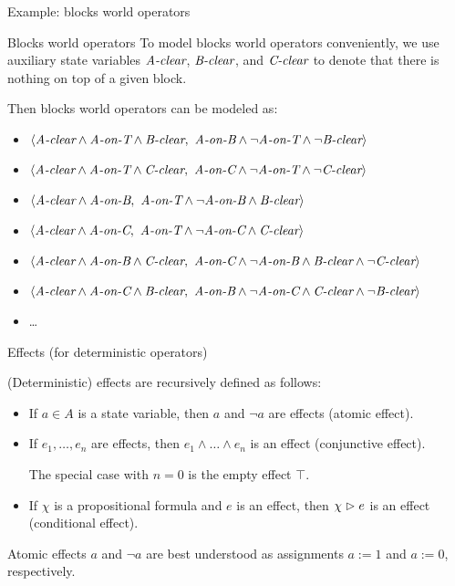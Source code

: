 \documentclass{gkibeamer}
\begin{document}
\begin{frame}{Example: blocks world operators}
  \begin{exampleblock}{Blocks world operators}
    To model blocks world operators conveniently, we use auxiliary
    state variables $\textit{A-clear}$, $\textit{B-clear}$, and $\textit{C-clear}$ to denote that
    there is nothing on top of a given block.

    \medskip

    Then blocks world operators can be modeled as:
    \small
    \begin{itemize}
    \item $\langle \textit{A-clear} \land \textit{A-on-T} \land \textit{B-clear},~ \textit{A-on-B} \land
      \neg \textit{A-on-T} \land \neg \textit{B-clear} \rangle$
    \item $\langle \textit{A-clear} \land \textit{A-on-T} \land\textit{C-clear},~ \textit{A-on-C} \land
      \neg \textit{A-on-T} \land \neg \textit{C-clear} \rangle$
    \item $\langle \textit{A-clear} \land \textit{A-on-B},~ \textit{A-on-T} \land \neg \textit{A-on-B}
      \land \textit{B-clear} \rangle$
    \item $\langle \textit{A-clear} \land \textit{A-on-C},~ \textit{A-on-T} \land \neg \textit{A-on-C}
      \land \textit{C-clear} \rangle$
    \item $\langle \textit{A-clear} \land \textit{A-on-B} \land \textit{C-clear},~ \textit{A-on-C} \land
      \neg \textit{A-on-B} \land \textit{B-clear} \land \neg \textit{C-clear}\rangle$
    \item $\langle \textit{A-clear} \land \textit{A-on-C} \land \textit{B-clear},~
      \textit{A-on-B} \land \neg \textit{A-on-C} \land \textit{C-clear} \land \neg \textit{B-clear}\rangle$
    \item \dots
    \end{itemize}
  \end{exampleblock}
\end{frame}

\begin{frame}{Effects (for deterministic operators)}
  \begin{definition}[effects]
    (Deterministic) \alert{effects} are recursively defined as follows:
    \begin{itemize}
    \item If $a \in A$ is a state variable, then \alert{$a$} and
      \alert{$\neg a$} are effects (\alert{atomic effect}).
    \item If $e_1, \dots, e_n$ are effects, then \alert{$e_1 \land
      \dots \land e_n$} is an effect (\alert{conjunctive effect}).

      The special case with $n=0$ is the empty effect $\top$.
    \item If $\chi$ is a propositional formula and $e$ is an effect, then
      \alert{$\chi \vartriangleright e$} is an effect (\alert{conditional effect}).
    \end{itemize}
  \end{definition}
  Atomic effects $a$ and $\neg a$ are best understood
  as assignments $a := 1$ and $a := 0$, respectively.
\end{frame}
\end{document}

